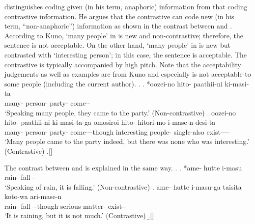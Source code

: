  distinguishes  coding given (in his term, anaphoric) information
from that coding contrastive information.
He argues that the contrastive  can code new (in his term, ``non-anaphoric'') information
as shown in the contrast between \Next[a] and \Next[b].
According to Kuno,
 `many people' in \Next[a] is new and non-contrastive;
therefore, the sentence is not acceptable.
On the other hand,  `many people' in \Next[b] is new but contrasted with  `interesting person';
in this case, the sentence is acceptable.
The contrastive  is typically accompanied by high pitch.
Note that the acceptability judgements as well as examples are from Kuno and
especially \Next[b] is not acceptable to some people (including the current author).
%
\ex.
 \ag. *oozei-no hito- paathii-ni ki-masi-ta \\
       many- person- party- come-- \\
       `Speaking many people, they came to the party.'
       \hfill{(Non-contrastive)}
 \bg. oozei-no hito- paathii-ni ki-masi-ta-ga omosiroi hito- hitori-mo i-mase-n-desi-ta \\
       many- person- party- come---though interesting people- single-also exist---- \\
       `Many people came to the party indeed, but there was none who was interesting.'
       \hfill{(Contrastive)}
 \b.[] \hfill{\cite[p.~47]{kuno73}}

The contrast between \Next[a] and \Next[b] is explained in the same way.
\ex.
 \ag. *ame- hutte i-masu \\
       rain- fall - \\
       `Speaking of rain, it is falling.'
       \hfill{(Non-contrastive)}
 \bg. ame- hutte i-masu-ga taisita koto-wa ari-mase-n \\
       rain- fall --though serious matter- exist-- \\
       `It is raining, but it is not much.'
       \hfill{(Contrastive)}
 \b.[] \hfill{\cite[p.~46]{kuno73}}
%

